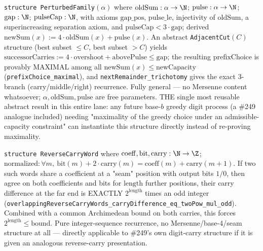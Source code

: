 \begin{thm}
\texttt{structure PerturbedFamily}$(\alpha)$ where $\mathrm{oldSum}:\alpha\to\N$;
$\mathrm{pulse}:\alpha\to\N$; $\mathrm{gap}:\N$; $\mathrm{pulseCap}:\N$, with axioms
$\mathrm{gap\_pos}$, $\mathrm{pulse\_le}$, injectivity of $\mathrm{oldSum}$, a superincreasing
separation axiom, and $\mathrm{pulseCap}<3\cdot\mathrm{gap}$; derived
$\mathrm{newSum}(x):=4\cdot\mathrm{oldSum}(x)+\mathrm{pulse}(x)$. An abstract
\texttt{AdjacentCut}$(C)$ structure (best subset $\le C$, best subset $>C$) yields
$\mathrm{successorCarries} := 4\cdot\mathrm{overshoot}+\mathrm{abovePulse}\le\mathrm{gap}$; the
resulting $\mathrm{prefixChoice}$ is provably MAXIMAL among all $\mathrm{newSum}(x)\le
\mathrm{newCapacity}$ (\texttt{prefixChoice\_maximal}), and \texttt{nextRemainder\_trichotomy}
gives the exact 3-branch (carry/middle/right) recurrence. Fully general — no Mersenne content
whatsoever; $\alpha,\mathrm{oldSum},\mathrm{pulse}$ are free parameters. THE single most
reusable abstract result in this entire lane: any future base-$b$ greedy digit process (a
\#249 analogue included) needing "maximality of the greedy choice under an admissible-capacity
constraint" can instantiate this structure directly instead of re-proving maximality.
\par\noindent{}     
\end{thm}

\begin{thm}
\texttt{structure ReverseCarryWord} where $\mathrm{coeff},\mathrm{bit},\mathrm{carry}:\N\to\Z$;
$\mathrm{normalized}: \forall m,\ \mathrm{bit}(m)+2\cdot\mathrm{carry}(m) = \mathrm{coeff}(m)+
\mathrm{carry}(m{+}1)$. If two such words share a coefficient at a "seam" position with output
bits $1/0$, then agree on both coefficients and bits for $\mathrm{length}$ further positions,
their carry difference at the far end is EXACTLY $2^{\mathrm{length}}$ times an odd integer
(\texttt{overlappingReverseCarryWords\_carryDifference\_eq\_twoPow\_mul\_odd}). Combined with a
common Archimedean bound on both carries, this forces $2^{\mathrm{length}}\le\mathrm{bound}$.
Pure integer-sequence recurrence, no Mersenne/base-4/seam structure at all — directly applicable
to \#249's own digit-carry structure if it is given an analogous reverse-carry presentation.
\par\noindent{}      
\end{thm}

